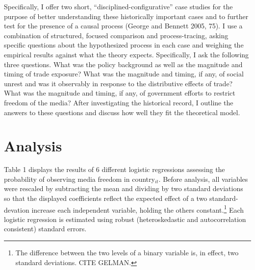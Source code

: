 \documentclass[a4paper]{article}\usepackage[]{graphicx}\usepackage[]{color}
\begin{document}
Specifically, I offer two short, “disciplined-configurative” case studies for the purpose of better understanding these historically important cases and to further test for the presence of a causal process (George and Bennett 2005, 75). I use a combination of structured, focused comparison and process-tracing, asking specific questions about the hypothesized process in each case and weighing the empirical results against what the theory expects. Specifically, I ask the following three questions. What was the policy background as well as the magnitude and timing of trade exposure? What was the magnitude and timing, if any, of social unrest and was it observably in response to the distributive effects of trade? What was the magnitude and timing, if any, of government efforts to restrict freedom of the media? After investigating the historical record, I outline the answers to these questions and discuss how well they fit the theoretical model.

\section{Analysis}


Table 1 displays the results of 6 different logistic regressions assessing the probability of observing media freedom in country$_{it}$. Before analysis, all variables were rescaled by subtracting the mean and dividing by two standard deviations so that the displayed coefficients reflect the expected effect of a two standard-devation increase each independent variable, holding the others constant.\footnote{The difference between the two levels of a binary variable is, in effect, two standard deviations. CITE GELMAN.}  Each logistic regression is estimated using robust (heteroskedastic and autocorrelation consistent) standard errors.
\end{document}
